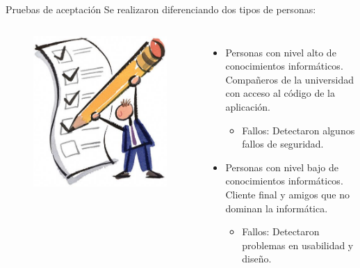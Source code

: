 \documentclass[spanish,xcolor=table,svgnames]{beamer}
\begin{document}
\begin{frame}{Pruebas de aceptación}
Se realizaron diferenciando dos tipos de personas:

\begin{columns}[c]

  \begin{figure}[]
\includegraphics[scale=0.2]{pruebas}
\end{figure}

\begin{itemize}
\item Personas con nivel alto de conocimientos informáticos.\\
Compañeros de la universidad con acceso al código de la aplicación.
\begin{itemize}
\item Fallos: Detectaron algunos fallos de seguridad.
\end{itemize}
\pause
\item Personas con nivel bajo de conocimientos informáticos.\\
Cliente final y amigos que no dominan la informática.
\begin{itemize}
\item Fallos: Detectaron problemas en usabilidad y diseño.
\end{itemize}
\end{itemize}
\end{columns}
\end{frame}
\end{document}
